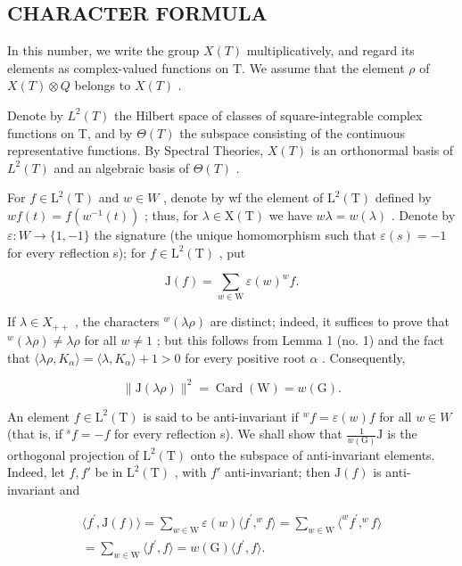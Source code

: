 \subsection{CHARACTER FORMULA}

In this number, we write the group \(X(T)\) multiplicatively, and regard its elements as complex-valued functions on T. We assume that the element \(\rho\) of \(X(T) \otimes Q\) belongs to \(X(T)\) .

Denote by \(L^{2}(T)\) the Hilbert space of classes of square-integrable complex functions on T, and by \(\Theta(T)\) the subspace consisting of the continuous representative functions. By Spectral Theories, \(X(T)\) is an orthonormal basis of \(L^{2}(T)\) and an algebraic basis of \(\Theta(T)\) .

For \(f \in \mathrm{L}^{2}(\mathrm{T})\) and \(w \in W\) , denote by wf the element of \(\mathrm{L}^{2}(\mathrm{T})\) defined by \(wf(t) = f(w^{-1}(t))\) ; thus, for \(\lambda \in \mathrm{X}(\mathrm{T})\) we have \(w\lambda = w(\lambda)\) . Denote by \(\varepsilon : W \to \{1, -1\}\) the signature (the unique homomorphism such that \(\varepsilon(s) = -1\) for every reflection s); for \(f \in \mathrm{L}^{2}(\mathrm{T})\) , put

\[
\mathrm{J} (f) = \sum_ {w \in \mathrm{W}} \varepsilon (w) ^ {w} f.
\]

If \(\lambda \in X_{++}\) , the characters \(^w (\lambda \rho)\) are distinct; indeed, it suffices to prove that \(^w (\lambda \rho)\neq \lambda \rho\) for all \(w\neq 1\) ; but this follows from Lemma 1 (no. 1) and the fact that \(\langle \lambda \rho ,K_{\alpha}\rangle = \langle \lambda ,K_{\alpha}\rangle +1 > 0\) for every positive root \(\alpha\) . Consequently,

\[
\| \mathrm{J} (\lambda \rho) \| ^ {2} = \operatorname{Card} (\mathrm{W}) = w (\mathrm{G}).
\]

An element \(f \in \mathrm{L}^{2}(\mathrm{T})\) is said to be anti-invariant if \(^{w}f = \varepsilon(w)f\) for all \(w \in W\) (that is, if \(^{s}f = -f\) for every reflection s). We shall show that \(\frac{1}{w(\mathrm{G})}\mathrm{J}\) is the orthogonal projection of \(\mathrm{L}^{2}(\mathrm{T})\) onto the subspace of anti-invariant elements. Indeed, let \(f, f'\) be in \(\mathrm{L}^{2}(\mathrm{T})\) , with \(f'\) anti-invariant; then \(\mathrm{J}(f)\) is anti-invariant and

\[
\begin{array}{c} \langle f ^ {\prime}, \mathrm{J} (f) \rangle = \sum_ {w \in \mathrm{W}} \varepsilon (w) \langle f ^ {\prime},   ^ {w} f \rangle = \sum_ {w \in \mathrm{W}} \langle^ {w} f ^ {\prime},   ^ {w} f \rangle \\ = \sum_ {w \in \mathrm{W}} \langle f ^ {\prime},   f \rangle = w (\mathrm{G}) \langle f ^ {\prime},   f \rangle . \end{array}
\]

